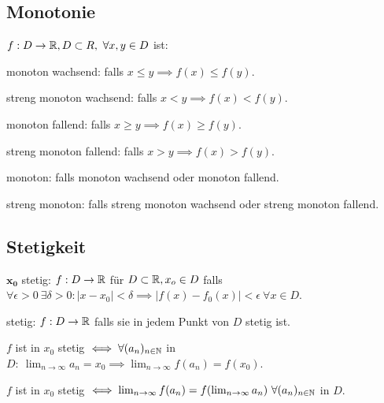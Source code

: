 \subsection{Monotonie}
$f : D \to \mathbb{R}, D \subset R, \ \forall x,y \in D$ ist:
\begin{compactdesc}
    \item[monoton wachsend:] falls $x \le y \implies f(x) \le f(y)$.
    \item[streng monoton wachsend:] falls $x < y \implies f(x) < f(y)$.
    \item[monoton fallend:] falls $x \ge y \implies f(x) \ge f(y)$.
    \item[streng monoton fallend:] falls $x > y \implies f(x) > f(y)$.
    \item[monoton:] falls monoton wachsend oder monoton fallend.
    \item[streng monoton:] falls streng monoton wachsend oder streng monoton fallend.
\end{compactdesc}

\subsection{Stetigkeit}
\begin{compactdesc}
    \item[$\mathbf{x_0}$ stetig:] $f: D \to \mathbb{R}$ für $D \subset \mathbb{R}, x_o \in D$  falls  $\forall \epsilon > 0 \ \exists \delta > 0: \left| x - x_0 \right| < \delta \implies \left| f(x) - f_0(x) \right| < \epsilon \ \forall x \in D $.
    \item[stetig:] $f: D \to \mathbb{R}$ falls sie in jedem Punkt von $D$ stetig ist.
\end{compactdesc}

\begin{compactitem}
    \item $f$ ist in $x_0$ stetig $\iff \forall (a_n)_{n \in \mathbb{N}}$ in $D: \ \lim_{n \to \infty} a_n = x_0 \implies \lim_{n \to \infty} f(a_n) = f(x_0)$.
        \begin{compactitem}
            \item $f$ ist in $x_0$ stetig $\iff \lim_{n \to \infty} f(a_n) = f( \lim_{n \to \infty} a_n) \ \forall (a_n)_{n \in \mathbb{N}}$ in $D$.
        \end{compactitem}
\end{compactitem}

